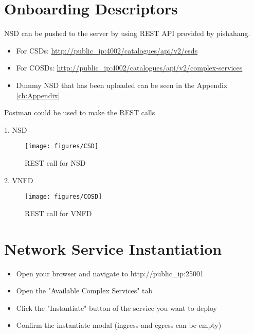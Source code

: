	\newpage
	
	\section{Onboarding Descriptors}

	NSD can be pushed to the server by using REST API provided by pishahang.
	\begin{itemize}
		\item For CSDs: \hyperlink{name}{http://public\_ip:4002/catalogues/api/v2/csds}
		\item For COSDs: \hyperlink{name}{http://public\_ip:4002/catalogues/api/v2/complex-services}
		\item Dummy NSD that has been uploaded can be seen in the Appendix \ref{ch:Appendix}
	\end{itemize}

	Postman could be used to make the REST calls
	
	1. NSD
	\begin{figure}[H]
		\centering
		\texttt{[image: figures/CSD]}
		\caption{REST call for NSD}
		\label{fig:csd}
	\end{figure}
		
	2. VNFD
	
	\begin{figure}[H]
		\centering
		\texttt{[image: figures/COSD]}
		\caption{REST call for VNFD}
		\label{fig:cosd}
	\end{figure}

	\section{Network Service Instantiation}
	\label{sec:Network Service Instantiation}
	\begin{itemize}
		\item Open your browser and navigate to http://public\_ip:25001
		\item Open the "Available Complex Services" tab
		\item Click the "Instantiate" button of the service you want to deploy
		\item Confirm the instantiate modal (ingress and egress can be empty)
		
	\end{itemize}
	



